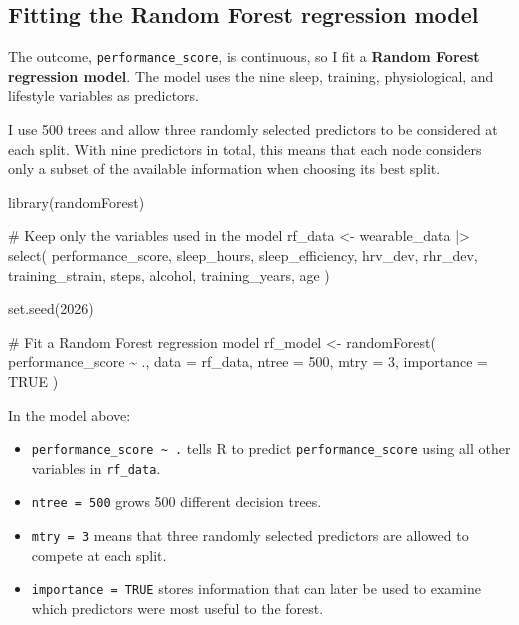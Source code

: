 \documentclass[
  letterpaper,
  DIV=11,
  numbers=noendperiod]{scrreprt}
\newenvironment{Shaded}{\begin{snugshade}}{\end{snugshade}}
\newcommand{\AttributeTok}[1]{\textcolor[rgb]{0.40,0.45,0.13}{#1}}
\newcommand{\CommentTok}[1]{\textcolor[rgb]{0.37,0.37,0.37}{#1}}
\newcommand{\ConstantTok}[1]{\textcolor[rgb]{0.56,0.35,0.01}{#1}}
\newcommand{\DecValTok}[1]{\textcolor[rgb]{0.68,0.00,0.00}{#1}}
\newcommand{\FunctionTok}[1]{\textcolor[rgb]{0.28,0.35,0.67}{#1}}
\newcommand{\NormalTok}[1]{\textcolor[rgb]{0.00,0.23,0.31}{#1}}
\newcommand{\OtherTok}[1]{\textcolor[rgb]{0.00,0.23,0.31}{#1}}
\newcommand{\SpecialCharTok}[1]{\textcolor[rgb]{0.37,0.37,0.37}{#1}}
\providecommand{\tightlist}{%
  \setlength{\itemsep}{0pt}\setlength{\parskip}{0pt}}
\begin{document}
\subsection{Fitting the Random Forest regression
model}\label{fitting-the-random-forest-regression-model}

The outcome, \texttt{performance\_score}, is continuous, so I fit a
\textbf{Random Forest regression model}. The model uses the nine sleep,
training, physiological, and lifestyle variables as predictors.

I use 500 trees and allow three randomly selected predictors to be
considered at each split. With nine predictors in total, this means that
each node considers only a subset of the available information when
choosing its best split.

\begin{Shaded}
\begin{Highlighting}[]
\FunctionTok{library}\NormalTok{(randomForest)}

\CommentTok{\# Keep only the variables used in the model}
\NormalTok{rf\_data }\OtherTok{\textless{}{-}}\NormalTok{ wearable\_data }\SpecialCharTok{|\textgreater{}}
  \FunctionTok{select}\NormalTok{(}
\NormalTok{    performance\_score,}
\NormalTok{    sleep\_hours,}
\NormalTok{    sleep\_efficiency,}
\NormalTok{    hrv\_dev,}
\NormalTok{    rhr\_dev,}
\NormalTok{    training\_strain,}
\NormalTok{    steps,}
\NormalTok{    alcohol,}
\NormalTok{    training\_years,}
\NormalTok{    age}
\NormalTok{  )}

\FunctionTok{set.seed}\NormalTok{(}\DecValTok{2026}\NormalTok{)}

\CommentTok{\# Fit a Random Forest regression model}
\NormalTok{rf\_model }\OtherTok{\textless{}{-}} \FunctionTok{randomForest}\NormalTok{(}
\NormalTok{  performance\_score }\SpecialCharTok{\textasciitilde{}}\NormalTok{ .,}
  \AttributeTok{data =}\NormalTok{ rf\_data,}
  \AttributeTok{ntree =} \DecValTok{500}\NormalTok{,}
  \AttributeTok{mtry =} \DecValTok{3}\NormalTok{,}
  \AttributeTok{importance =} \ConstantTok{TRUE}
\NormalTok{)}
\end{Highlighting}
\end{Shaded}

In the model above:

\begin{itemize}
\tightlist
\item
  \texttt{performance\_score\ \textasciitilde{}\ .} tells R to predict
  \texttt{performance\_score} using all other variables in
  \texttt{rf\_data}.
\item
  \texttt{ntree\ =\ 500} grows 500 different decision trees.
\item
  \texttt{mtry\ =\ 3} means that three randomly selected predictors are
  allowed to compete at each split.
\item
  \texttt{importance\ =\ TRUE} stores information that can later be used
  to examine which predictors were most useful to the forest.
\end{itemize}
\end{document}
